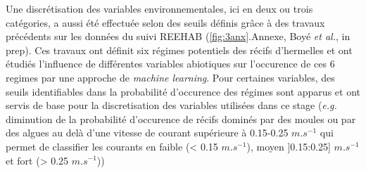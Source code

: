 \documentclass[12pt]{report}
\begin{document}
Une discrétisation des variables environnementales, ici en deux ou trois catégories, a aussi été effectuée selon des seuils définis grâce à des travaux précédents sur les données du suivi REEHAB (\autoref{fig:3anx}.Annexe, Boyé \textit{et al.}, in prep). Ces travaux ont définit six régimes potentiels des récifs d’hermelles et ont étudiés l’influence de différentes variables abiotiques sur l’occurence de ces 6 regimes par une approche de \textit{machine learning}. Pour certaines variables, des seuils identifiables dans la probabilité d’occurence des régimes sont apparus et ont servis de base pour la discretisation des variables utilisées dans ce stage (\textit{e.g.} diminution de la probabilité d’occurence de récifs dominés par des moules ou par des algues au delà d’une vitesse de courant supérieure à 0.15-0.25 $m.s^{-1}$ qui permet de classifier les courants en faible (< 0.15 $m.s^{-1}$), moyen ]0.15:0.25] $m.s^{-1}$ et fort (> 0.25 $m.s^{-1}$))
\newline \newline
\end{document}
